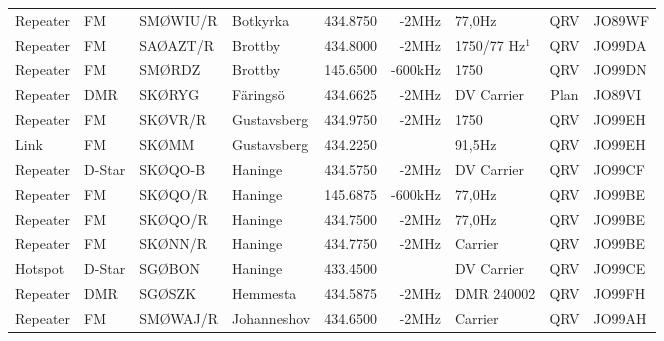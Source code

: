 \begin{landscape}
\begin{longtable}{llllrrlcl}
Repeater & FM           & SMØWIU/R      & Botkyrka     &          434.8750 &          -2MHz & 77,0Hz          &       QRV       & JO89WF           \\
	Repeater           & FM           & SAØAZT/R      & Brottby      &          434.8000 &          -2MHz & 1750/77 Hz$^1$  &       QRV       & JO99DA           \\
	Repeater           & FM           & SMØRDZ        & Brottby      &          145.6500 &        -600kHz & 1750            &       QRV       & JO99DN           \\
	Repeater           & DMR          & SKØRYG        & Färingsö     &          434.6625 &          -2MHz & DV Carrier      &      Plan       & JO89VI           \\
	Repeater           & FM           & SKØVR/R       & Gustavsberg  &          434.9750 &          -2MHz & 1750            &       QRV       & JO99EH           \\
	Link               & FM           & SKØMM         & Gustavsberg  &          434.2250 &                & 91,5Hz          &       QRV       & JO99EH           \\
	Repeater           & D-Star       & SKØQO-B       & Haninge      &          434.5750 &          -2MHz & DV Carrier      &       QRV       & JO99CF           \\
	Repeater           & FM           & SKØQO/R       & Haninge      &          145.6875 &        -600kHz & 77,0Hz          &       QRV       & JO99BE           \\
	Repeater           & FM           & SKØQO/R       & Haninge      &          434.7500 &          -2MHz & 77,0Hz          &       QRV       & JO99BE           \\
	Repeater           & FM           & SKØNN/R       & Haninge      &          434.7750 &          -2MHz & Carrier         &       QRV       & JO99BE           \\
	Hotspot            & D-Star       & SGØBON        & Haninge      &          433.4500 &                & DV Carrier      &       QRV       & JO99CE           \\
	Repeater           & DMR          & SGØSZK        & Hemmesta     &          434.5875 &          -2MHz & DMR 240002      &       QRV       & JO99FH           \\
	Repeater           & FM           & SMØWAJ/R      & Johanneshov  &          434.6500 &          -2MHz & Carrier         &       QRV       & JO99AH           \\

\end{longtable}
\end{landscape}
